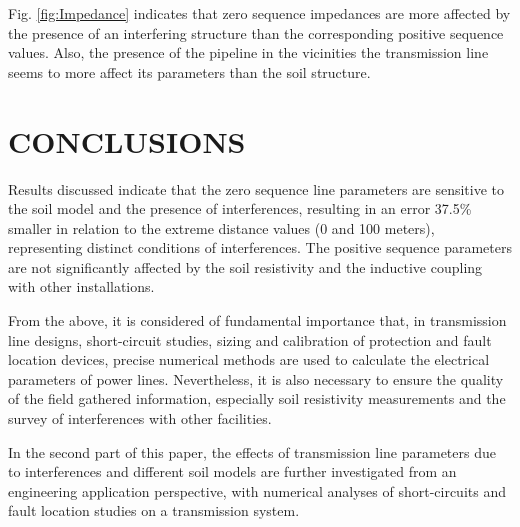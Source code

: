 \documentclass[conference]{IEEEtran}
\begin{document}
	Fig. \ref{fig:Impedance} indicates that zero sequence impedances are more affected by the presence of an interfering structure than the corresponding positive sequence values. Also, the presence of the pipeline in the vicinities the transmission line seems to more affect its parameters than the soil structure.
	
	\section{CONCLUSIONS}
	
	Results discussed indicate that the zero sequence line parameters are sensitive to the soil model and the presence of interferences, resulting in an error 37.5\% smaller in relation to the extreme distance values (0 and 100 meters), representing distinct conditions of interferences. The positive sequence parameters are not significantly affected by the soil resistivity and the inductive coupling with other installations.
	
	From the above, it is considered of fundamental importance that, in transmission line designs, short-circuit studies, sizing and calibration of protection and fault location devices, precise numerical methods are used to calculate the electrical parameters of power lines. Nevertheless, it is also necessary to ensure the quality of the field gathered information, especially soil resistivity measurements and the survey of interferences with other facilities. 
	
	In the second part of this paper, the effects of transmission line parameters due to interferences and different soil models are further investigated from an engineering application perspective, with numerical analyses of short-circuits and fault location studies on a transmission system.  
	
	
	
	
	\nocite{*}
	
	
	
\end{document}

